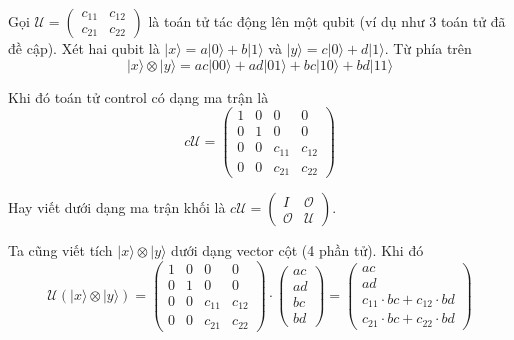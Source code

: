 \begin{definition}    
    Gọi $\mathcal{U} = \begin{pmatrix} c_{11} & c_{12} \\ c_{21} & c_{22} \end{pmatrix}$ là toán tử tác động lên một qubit (ví dụ như 3 toán tử đã đề cập). Xét hai qubit là $\lvert x \rangle = a \lvert 0 \rangle + b \lvert 1 \rangle$ và $\lvert y \rangle = c \lvert 0 \rangle + d \lvert 1 \rangle$. Từ phía trên
    \begin{equation*}
        \lvert x \rangle \otimes \lvert y \rangle = ac \lvert 00 \rangle + ad \lvert 01 \rangle + bc \lvert 10 \rangle + bd \lvert 11 \rangle
    \end{equation*}

    Khi đó toán tử control có dạng ma trận là
    \begin{equation*}
        c \mathcal{U} = \begin{pmatrix} 1 & 0 & 0 & 0 \\ 0 & 1 & 0 & 0 \\ 0 & 0 & c_{11} & c_{12} \\ 0 & 0 & c_{21} & c_{22} \end{pmatrix}
    \end{equation*}

    Hay viết dưới dạng ma trận khối là $c \mathcal{U} = \begin{pmatrix} I & \mathcal{O} \\ \mathcal{O} & \mathcal{U} \end{pmatrix}$.
\end{definition}

Ta cũng viết tích $\lvert x \rangle \otimes \lvert y \rangle$ dưới dạng vector cột (4 phần tử). Khi đó
\begin{equation*}
    \mathcal{U} (\lvert x \rangle \otimes \lvert y \rangle) = \begin{pmatrix} 1 & 0 & 0 & 0 \\ 0 & 1 & 0 & 0 \\ 0 & 0 & c_{11} & c_{12} \\ 0 & 0 & c_{21} & c_{22} \end{pmatrix} \cdot \begin{pmatrix} ac \\ ad \\ bc \\ bd \end{pmatrix} = \begin{pmatrix} ac \\ ad \\ c_{11} \cdot bc + c_{12} \cdot bd \\ c_{21} \cdot bc + c_{22} \cdot bd \end{pmatrix}
\end{equation*}

